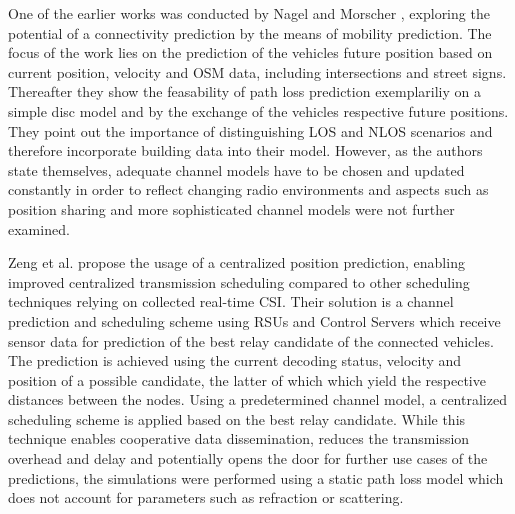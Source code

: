 \documentclass[conference]{IEEEtran}
\begin{document}
One of the earlier works was conducted by Nagel and Morscher \cite{nagelConnectivityPredictionMobile2011}, exploring the potential of a connectivity prediction by the means of mobility prediction. The focus of the work lies on the prediction of the vehicles future position based on current position, velocity and OSM data, including intersections and street signs. Thereafter they show the feasability of path loss prediction exemplariliy on a simple disc model and by the exchange of the vehicles respective future positions. They point out the importance of distinguishing LOS and NLOS scenarios and therefore incorporate building data into their model. However, as the authors state themselves, adequate channel models have to be chosen and updated constantly in order to reflect changing radio environments and aspects such as position sharing and more sophisticated channel models were not further examined.

Zeng et al. \cite{zengChannelPredictionBased2017} propose the usage of a centralized position prediction, enabling improved centralized transmission scheduling compared to other scheduling techniques relying on collected real-time CSI. Their solution is a channel prediction and scheduling scheme using RSUs and Control Servers which receive sensor data for prediction of the best relay candidate of the connected vehicles. The prediction is achieved using the current decoding status, velocity and position of a possible candidate, the latter of which which yield the respective distances between the nodes. Using a predetermined channel model, a centralized scheduling scheme is applied based on the best relay candidate. While this technique enables cooperative data dissemination, reduces the transmission overhead and delay and potentially opens the door for further use cases of the predictions, the simulations were performed using a static path loss model which does not account for parameters such as refraction or scattering.
\end{document}
